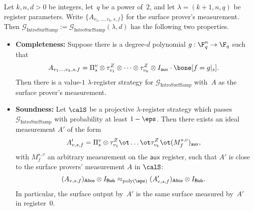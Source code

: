 \documentclass[11pt]{article}
\newcommand{\register}{\lambda}
\newcommand{\game}{\mathscr{G}}
\newcommand{\reg}[1]{{\mathsf{#1}}}
\begin{document}
\begin{theorem}\label{thm:big-planes}
Let $k, n, d>0$ be integers, let~$q$ be a power of~$2$,
and let $\lambda = (k+1, n, q)$ be register parameters.
Write $\{A_{v_1, \ldots, v_k, s, f}\}$ for the surface prover's measurement.
Then $\game_{\mathrm{IntroSurfSamp}} := \game_{\mathrm{IntroSurfSamp}}(\lambda, d)$ has the following two properties.
  \begin{itemize}
  \item[$\circ$] \textbf{Completeness:}
    		Suppose there is a degree-$d$ polynomial $g:\F_q^{n}\rightarrow \F_q$ such that
		\begin{equation*}
			A_{v_1 \ldots, v_k,s,f} = \Pi^{v}_s \otimes \tau^Z_{v_1} \otimes
                        \cdots \otimes \tau^{Z}_{v_k} \otimes I_{\reg{aux}} \cdot \bone[f = g|_{s}].
		\end{equation*}
		Then there is a value-$1$ $\lambda$-register strategy
                for $\game_{\mathrm{IntroSurfSamp}}$ with~$A$ as the
                surface prover's measurement.
  \item[$\circ$]\textbf{Soundness:}
Let $\calS$ be a projective $\register$-register strategy which passes $\game_{\mathrm{IntroSurfSamp}}$ with probability at least $1-\eps$.
Then there exists an ideal measurement $A'$ of the form
\[ A'_{v, s, f} =\Pi^v_s \otimes  \tau^Z_{v_1} \ot
  \dots \ot \tau^Z_{v_k} \ot 
    (M^{s,v}_{f})_{\reg{aux}}, \]
with $M^{s, v}_{f}$ an arbitrary measurement on the
$\reg{aux}$ register, such that $A'$ is close to the surface provers'
measurement $A$ in $\calS$:
\begin{equation*}
(A_{v, s, f})_{\reg{Alice}} \otimes I_{\reg{Bob}}
\approx_{\mathrm{poly}(\eps)} (A'_{v,
  s, f})_{\reg{Alice}} \otimes I_{\reg{Bob}}.
\end{equation*}
In particular, the surface output by~$A'$ is the same surface measured by~$A'$ in register~$0$.
\end{itemize}
\end{theorem}
\end{document}
